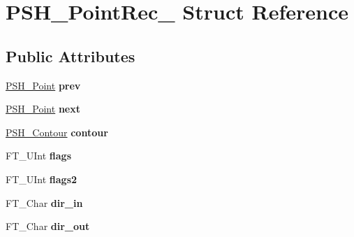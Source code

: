 \hypertarget{struct_p_s_h___point_rec__}{}\section{P\+S\+H\+\_\+\+Point\+Rec\+\_\+ Struct Reference}
\label{struct_p_s_h___point_rec__}
\subsection*{Public Attributes}
\begin{DoxyCompactItemize}
\item 
\mbox{\label{struct_p_s_h___point_rec___a4bcea810dd0a31e9a2ecf6a9a9f1f54e}} 
\hyperlink{struct_p_s_h___point_rec__}{P\+S\+H\+\_\+\+Point} {\bfseries prev}
\item 
\mbox{\label{struct_p_s_h___point_rec___a9e5fdea59770272ca2ad1d7738f151b1}} 
\hyperlink{struct_p_s_h___point_rec__}{P\+S\+H\+\_\+\+Point} {\bfseries next}
\item 
\mbox{\label{struct_p_s_h___point_rec___aabab25d215eb72dfbf660a1dc34638da}} 
\hyperlink{struct_p_s_h___contour_rec__}{P\+S\+H\+\_\+\+Contour} {\bfseries contour}
\item 
\mbox{\label{struct_p_s_h___point_rec___a4e8ff007cec28131544b2ab18d31dece}} 
F\+T\+\_\+\+U\+Int {\bfseries flags}
\item 
\mbox{\label{struct_p_s_h___point_rec___ab71eb24a6073342c50e6dd891e4f8af4}} 
F\+T\+\_\+\+U\+Int {\bfseries flags2}
\item 
\mbox{\label{struct_p_s_h___point_rec___a9ec38c3873255a735244ca2c1d1312a5}} 
F\+T\+\_\+\+Char {\bfseries dir\+\_\+in}
\item 
\mbox{\label{struct_p_s_h___point_rec___a52bd7db9cde5975efb5ddca68fd4329d}} 
F\+T\+\_\+\+Char {\bfseries dir\+\_\+out}
\item 
\mbox{\label{struct_p_s_h___point_rec___a1dc99602e87f3fa14ac6af2d2ba040f4}} 

\end{DoxyCompactItemize}
